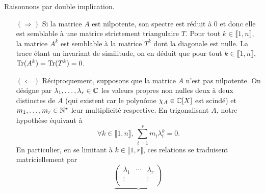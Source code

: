 \begin{preuve}
    Raisonnons par double implication.
    \begin{itemize}
        \item[$(\Rightarrow)$] Si la matrice $A$ est nilpotente, son spectre est réduit à $0$ et donc elle est semblable à une matrice strictement triangulaire $T$. Pour tout $k \in \llbracket 1, n \rrbracket$, la matrice $A^k$ est semblable à la matrice $T^k$ dont la diagonale est nulle. La trace étant un invariant de similitude, on en déduit que pour tout $k \in \llbracket 1, n \rrbracket$, $\Tr(A^k) = \Tr(T^k) = 0$.
        \item[$(\Leftarrow)$] Réciproquement, supposons que la matrice $A$ n'est pas nilpotente. On désigne par $\lambda_1, \dots, \lambda_r \in \C$ les valeurs propres non nulles deux à deux distinctes de $A$ (qui existent car le polynôme $\chi_A \in \C[X]$ est scindé) et $m_1, \dots, m_r \in \Ne$ leur multiplicité respective. En trigonalisant $A$, notre hypothèse équivaut à 
        $$\forall k \in \llbracket 1, n \rrbracket,\ \sum_{i=1}^r m_i \lambda_i^k = 0.$$
        En particulier, en se limitant à $k \in \llbracket 1, r \rrbracket$, ces relations se traduisent matriciellement par
        $$
        \underbrace{
        \begin{pmatrix}
        \lambda_1 & \cdots & \lambda_r \\
        \vdots & & \vdots \\

\end{pmatrix}}$$
\end{itemize}
\end{preuve}
